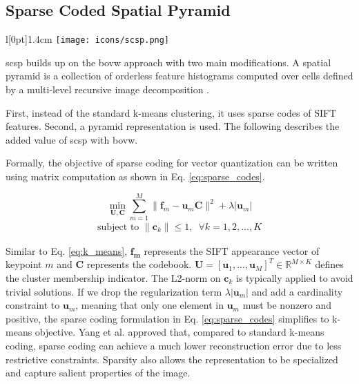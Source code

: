 \subsection{Sparse Coded Spatial Pyramid} \label{scp}
\begingroup
\setlength\intextsep{0pt}
\begin{wrapfigure}[4]{l}[0pt]{1.4cm}
\texttt{[image: icons/scsp.png]}
\end{wrapfigure}

\gls{scsp} builds up on the \gls{bovw} approach with two main modifications.
A spatial pyramid is a collection of orderless feature histograms computed over cells defined by a multi-level recursive image decomposition \cite{lazebnik09}.

First, instead of the standard k-means clustering, it uses sparse codes of SIFT features.
Second, a pyramid representation is used.
The following describes the added value of \gls{scsp} with \gls{bovw}.

Formally, the objective of sparse coding for vector quantization can be written using matrix computation as shown in Eq. \ref{eq:sparse_codes}.

\begin{equation}
  \min_{\boldsymbol{U,C}} \sum_{m=1}^M \|\boldsymbol{f}_m - \boldsymbol{u}_m \boldsymbol{C}\|^2 + \lambda |\boldsymbol{u}_m|
  \label{eq:sparse_codes} 
\end{equation}
\begin{align*}
  \textrm{subject to } \|\boldsymbol{c}_k\| \leq 1, \hspace{6pt} \forall{k} = 1,2,...,K
\end{align*}

Similar to Eq. \ref{eq:k_means}, $\boldsymbol{f_m}$ represents the SIFT appearance vector of keypoint $m$ and $\boldsymbol{C}$ represents the codebook. $\boldsymbol{U} = [\boldsymbol{u}_1,...,\boldsymbol{u}_M]^T \in \mathbb{R}^{M \times K}$ defines the cluster membership indicator. The L2-norm on $\boldsymbol{c}_k$ is typically applied to avoid trivial solutions. If we drop the regularization term $\lambda |\boldsymbol{u}_m|$ and add a cardinality constraint to $\boldsymbol{u}_m$, meaning that only one element in $\boldsymbol{u}_m$ must be nonzero and positive, the sparse coding formulation in Eq. \ref{eq:sparse_codes} simplifies to k-means objective. Yang et al. \cite{yang09} approved that, compared to standard k-means coding, sparse coding can achieve a much lower reconstruction error due to less restrictive constraints. Sparsity also allows the representation to be specialized and capture salient properties of the image.

